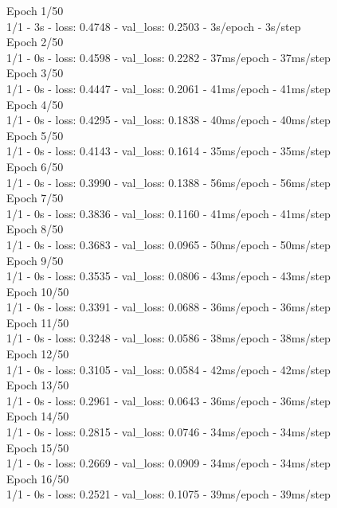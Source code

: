 Epoch 1/50 \\
1/1 - 3s - loss: 0.4748 - val\_loss: 0.2503 - 3s/epoch - 3s/step \\
Epoch 2/50 \\
1/1 - 0s - loss: 0.4598 - val\_loss: 0.2282 - 37ms/epoch - 37ms/step \\
Epoch 3/50 \\
1/1 - 0s - loss: 0.4447 - val\_loss: 0.2061 - 41ms/epoch - 41ms/step \\
Epoch 4/50 \\
1/1 - 0s - loss: 0.4295 - val\_loss: 0.1838 - 40ms/epoch - 40ms/step \\
Epoch 5/50 \\
1/1 - 0s - loss: 0.4143 - val\_loss: 0.1614 - 35ms/epoch - 35ms/step \\
Epoch 6/50 \\
1/1 - 0s - loss: 0.3990 - val\_loss: 0.1388 - 56ms/epoch - 56ms/step \\
Epoch 7/50 \\
1/1 - 0s - loss: 0.3836 - val\_loss: 0.1160 - 41ms/epoch - 41ms/step \\
Epoch 8/50 \\
1/1 - 0s - loss: 0.3683 - val\_loss: 0.0965 - 50ms/epoch - 50ms/step \\
Epoch 9/50 \\
1/1 - 0s - loss: 0.3535 - val\_loss: 0.0806 - 43ms/epoch - 43ms/step \\
Epoch 10/50 \\
1/1 - 0s - loss: 0.3391 - val\_loss: 0.0688 - 36ms/epoch - 36ms/step \\
Epoch 11/50 \\
1/1 - 0s - loss: 0.3248 - val\_loss: 0.0586 - 38ms/epoch - 38ms/step \\
Epoch 12/50 \\
1/1 - 0s - loss: 0.3105 - val\_loss: 0.0584 - 42ms/epoch - 42ms/step \\
Epoch 13/50 \\
1/1 - 0s - loss: 0.2961 - val\_loss: 0.0643 - 36ms/epoch - 36ms/step \\
Epoch 14/50 \\
1/1 - 0s - loss: 0.2815 - val\_loss: 0.0746 - 34ms/epoch - 34ms/step \\
Epoch 15/50 \\
1/1 - 0s - loss: 0.2669 - val\_loss: 0.0909 - 34ms/epoch - 34ms/step \\
Epoch 16/50 \\
1/1 - 0s - loss: 0.2521 - val\_loss: 0.1075 - 39ms/epoch - 39ms/step \\
